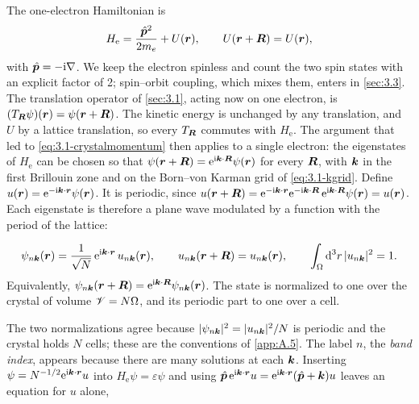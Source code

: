 The one-electron Hamiltonian is
\begin{equation}
  H_{\mathrm{e}} = \frac{\hat{\bm{p}}^2}{2m_e} + U(\bm{r}), \qquad U(\bm{r} + \bm{R}) = U(\bm{r}) ,
  \label{eq:3.2-He}
\end{equation}
with $\hat{\bm{p}} = -\mathrm{i}\nabla$. We keep the electron spinless and count the two spin states with an explicit factor of 2; spin--orbit coupling, which mixes them, enters in \cref{sec:3.3}. The translation operator of \cref{sec:3.1}, acting now on one electron, is $(T_{\bm{R}}\psi)(\bm{r}) = \psi(\bm{r} + \bm{R})$. The kinetic energy is unchanged by any translation, and $U$ by a lattice translation, so every $T_{\bm{R}}$ commutes with $H_{\mathrm{e}}$. The argument that led to \cref{eq:3.1-crystalmomentum} then applies to a single electron: the eigenstates of $H_{\mathrm{e}}$ can be chosen so that $\psi(\bm{r} + \bm{R}) = \mathrm{e}^{\mathrm{i}\bm{k}\cdot\bm{R}}\psi(\bm{r})$ for every $\bm{R}$, with $\bm{k}$ in the first Brillouin zone and on the Born--von Karman grid of \cref{eq:3.1-kgrid}. Define $u(\bm{r}) = \mathrm{e}^{-\mathrm{i}\bm{k}\cdot\bm{r}}\psi(\bm{r})$. It is periodic, since $u(\bm{r} + \bm{R}) = \mathrm{e}^{-\mathrm{i}\bm{k}\cdot\bm{r}}\mathrm{e}^{-\mathrm{i}\bm{k}\cdot\bm{R}}\,\mathrm{e}^{\mathrm{i}\bm{k}\cdot\bm{R}}\psi(\bm{r}) = u(\bm{r})$. Each eigenstate is therefore a plane wave modulated by a function with the period of the lattice:
\begin{keyresult}
\begin{equation}
  \psi_{n\bm{k}}(\bm{r}) = \frac{1}{\sqrt N}\,\mathrm{e}^{\mathrm{i}\bm{k}\cdot\bm{r}}\,u_{n\bm{k}}(\bm{r}), \qquad
  u_{n\bm{k}}(\bm{r} + \bm{R}) = u_{n\bm{k}}(\bm{r}), \qquad
  \int_\Omega\mathrm{d}^3r\,|u_{n\bm{k}}|^2 = 1 .
  \label{eq:3.2-bloch}
\end{equation}
Equivalently, $\psi_{n\bm{k}}(\bm{r} + \bm{R}) = \mathrm{e}^{\mathrm{i}\bm{k}\cdot\bm{R}}\psi_{n\bm{k}}(\bm{r})$. The state is normalized to one over the crystal of volume $\mathscr{V} = N\Omega$, and its periodic part to one over a cell.
\end{keyresult}
The two normalizations agree because $|\psi_{n\bm{k}}|^2 = |u_{n\bm{k}}|^2/N$ is periodic and the crystal holds $N$ cells; these are the conventions of \cref{app:A.5}. The label $n$, the \emph{band index}, appears because there are many solutions at each $\bm{k}$. Inserting $\psi = N^{-1/2}\mathrm{e}^{\mathrm{i}\bm{k}\cdot\bm{r}}u$ into $H_{\mathrm{e}}\psi = \varepsilon\psi$ and using $\hat{\bm{p}}\,\mathrm{e}^{\mathrm{i}\bm{k}\cdot\bm{r}}u = \mathrm{e}^{\mathrm{i}\bm{k}\cdot\bm{r}}(\hat{\bm{p}} + \bm{k})u$ leaves an equation for $u$ alone,
